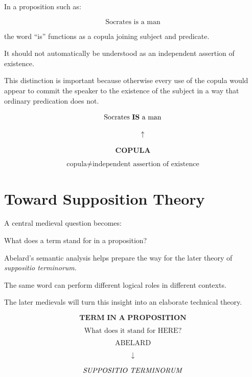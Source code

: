 \documentclass[11pt]{article}
\newcommand{\latin}[1]{\textit{#1}}
\begin{document}
In a proposition such as:

\[
\text{Socrates is a man}
\]

the word ``is'' functions as a copula joining subject and
predicate.

It should not automatically be understood as an independent
assertion of existence.

This distinction is important because otherwise every use of the
copula would appear to commit the speaker to the existence of the
subject in a way that ordinary predication does not.

\begin{whiteboard}
\[
\text{Socrates \textbf{IS} a man}
\]

\[
\hspace{0.4in}\uparrow
\]

\[
\textbf{COPULA}
\]

\[
\boxed{\text{copula} \neq \text{independent assertion of existence}}
\]
\end{whiteboard}

\section{Toward Supposition Theory}

A central medieval question becomes:

\begin{center}
What does a term stand for in a proposition?
\end{center}

Abelard's semantic analysis helps prepare the way for the later
theory of \latin{suppositio terminorum}.

The same word can perform different logical roles in different
contexts.

The later medievals will turn this insight into an elaborate
technical theory.

\begin{whiteboard}
\[
\textbf{TERM IN A PROPOSITION}
\]

\[
\boxed{\text{What does it stand for HERE?}}
\]

\[
\text{ABELARD}
\]

\[
\downarrow
\]

\[
\text{\latin{SUPPOSITIO TERMINORUM}}
\]
\end{whiteboard}

\end{document}
